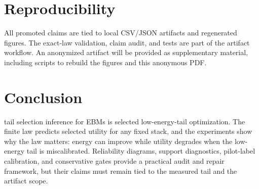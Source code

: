 \documentclass{article}
\begin{document}
\section{Reproducibility}

All promoted claims are tied to local CSV/JSON artifacts and regenerated figures. The exact-law validation, claim audit, and tests are part of the artifact workflow. An anonymized artifact will be provided as supplementary material, including scripts to rebuild the figures and this anonymous PDF.

\section{Conclusion}

tail selection inference for EBMs is selected low-energy-tail optimization. The finite law predicts selected utility for any fixed stack, and the experiments show why the law matters: energy can improve while utility degrades when the low-energy tail is miscalibrated. Reliability diagrams, support diagnostics, pilot-label calibration, and conservative gates provide a practical audit and repair framework, but their claims must remain tied to the measured tail and the artifact scope.




\appendix

\end{document}
